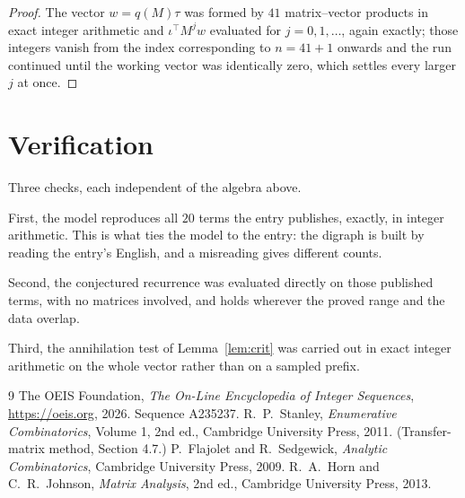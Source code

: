 \documentclass[11pt,a4paper]{article}
\theoremstyle{plain}
\theoremstyle{definition}
\begin{document}
\begin{proof}
The vector $w=q(M)\tau$ was formed by $41$ matrix--vector products in exact integer
arithmetic and $\iota^{\!\top}M^{j}w$ evaluated for $j=0,1,\dots$, again exactly; those
integers vanish from the index corresponding to $n=41+1$ onwards and the run continued
until the working vector was identically zero, which settles every larger $j$ at once.
\end{proof}

\section{Verification}

Three checks, each independent of the algebra above.

First, the model reproduces all $20$ terms the entry publishes, exactly, in integer
arithmetic. This is what ties the model to the entry: the digraph is built by reading the
entry's English, and a misreading gives different counts.

Second, the conjectured recurrence was evaluated directly on those published terms, with no
matrices involved, and holds wherever the proved range and the data overlap.

Third, the annihilation test of Lemma~\ref{lem:crit} was carried out in exact integer
arithmetic on the whole vector rather than on a sampled prefix.

\begin{thebibliography}{9}
 The OEIS Foundation, \emph{The On-Line Encyclopedia of Integer
Sequences}, \url{https://oeis.org}, 2026. Sequence A235237.
 R.~P.~Stanley, \emph{Enumerative Combinatorics}, Volume 1, 2nd ed.,
Cambridge University Press, 2011. (Transfer-matrix method, Section 4.7.)
 P.~Flajolet and R.~Sedgewick, \emph{Analytic Combinatorics}, Cambridge
University Press, 2009.
 R.~A.~Horn and C.~R.~Johnson, \emph{Matrix Analysis}, 2nd ed., Cambridge
University Press, 2013.
\end{thebibliography}
\end{document}
